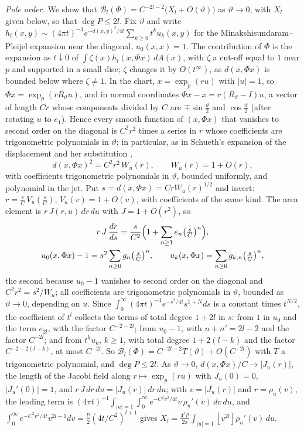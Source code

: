 \documentclass[pdflatex,sn-mathphys-num]{sn-jnl}
\theoremstyle{thmstyleone}%
\theoremstyle{thmstylethree}%
\begin{document}
\emph{Pole order.} We show that $\mathcal B_l(\Phi)=C^{-2l-2}\bigl(X_l+O(\vartheta)\bigr)$ as $\vartheta\to0$, with $X_l$ given below, so that $\deg P\le2l$. Fix $\vartheta$ and write $h_t(x,y)\sim(4\pi t)^{-1}e^{-d(x,y)^2/4t}\sum_{k\ge0}t^ku_k(x,y)$ for the Minakshisundaram--Pleijel expansion near the diagonal, $u_0(x,x)=1$. The contribution of $\Phi$ is the expansion as $t\downarrow0$ of $\int\zeta(x)h_t(x,\Phi x)\,dA(x)$, with $\zeta$ a cut-off equal to $1$ near $p$ and supported in a small disc; $\zeta$ changes it by $O(t^\infty)$, as $d(x,\Phi x)$ is bounded below where $\zeta\ne1$. In the chart, $x=\exp_p(ru)$ with $|u|=1$, so $\Phi x=\exp_p(rR_\vartheta u)$, and in normal coordinates $\Phi x-x=r(R_\vartheta-I)u$, a vector of length $Cr$ whose components divided by $C$ are $\mp\sin\frac\vartheta2$ and $\cos\frac\vartheta2$ (after rotating $u$ to $e_1$). Hence every smooth function of $(x,\Phi x)$ that vanishes to second order on the diagonal is $C^2r^2$ times a series in $r$ whose coefficients are trigonometric polynomials in $\vartheta$; in particular, as in Schueth's expansion of the displacement \cite[Cor.~2.4, Lemma~3.4, (3.2)]{schueth2019} and her substitution \cite[(3.4), (3.5)]{schueth2019},
\[
d(x,\Phi x)^2=C^2r^2\,W_u(r),\qquad W_u(r)=1+O(r),
\]
with coefficients trigonometric polynomials in $\vartheta$, bounded uniformly, and polynomial in the jet. Put $s=d(x,\Phi x)=CrW_u(r)^{1/2}$ and invert: $r=\frac sC\,V_u(\frac sC)$, $V_u(v)=1+O(v)$, with coefficients of the same kind. The area element is $r\,J(r,u)\,dr\,du$ with $J=1+O(r^2)$, so
\begin{gather*}
r\,J\,\frac{dr}{ds}=\frac{s}{C^2}\Bigl(1+\sum_{n\ge1}e_n\bigl(\tfrac sC\bigr)^n\Bigr),\\
u_0(x,\Phi x)-1=s^2\sum_{n\ge0}g_n\bigl(\tfrac sC\bigr)^n,\qquad u_k(x,\Phi x)=\sum_{n\ge0}g_{k,n}\bigl(\tfrac sC\bigr)^n,
\end{gather*}
the second because $u_0-1$ vanishes to second order on the diagonal \cite[(2.3)]{schueth2019} and $C^2r^2=s^2/W_u$; all coefficients are trigonometric polynomials in $\vartheta$, bounded as $\vartheta\to0$, depending on $u$. Since $\int_0^\infty(4\pi t)^{-1}e^{-s^2/4t}s^{1+N}ds$ is a constant times $t^{N/2}$, the coefficient of $t^l$ collects the terms of total degree $1+2l$ in $s$: from $1$ in $u_0$ and the term $e_{2l}$, with the factor $C^{-2-2l}$; from $u_0-1$, with $n+n'=2l-2$ and the factor $C^{-2l}$; and from $t^ku_k$, $k\ge1$, with total degree $1+2(l-k)$ and the factor $C^{-2-2(l-k)}$, at most $C^{-2l}$. So $\mathcal B_l(\Phi)=C^{-2l-2}T(\vartheta)+O(C^{-2l})$ with $T$ a trigonometric polynomial, and $\deg P\le2l$. As $\vartheta\to0$, $d(x,\Phi x)/C\to|J_u(r)|$, the length of the Jacobi field along $r\mapsto\exp_p(ru)$ with $J_u(0)=0$, $|J_u'(0)|=1$, and $r\,J\,dr\,du=|J_u(r)|\,dr\,du$; with $v=|J_u(r)|$ and $r=\rho_u(v)$, the leading term is $(4\pi t)^{-1}\int_{|u|=1}\int_0^\infty e^{-C^2v^2/4t}v\,\rho_u'(v)\,dv\,du$, and $\int_0^\infty e^{-C^2v^2/4t}v^{2l+1}dv=\frac{l!}2(4t/C^2)^{l+1}$ gives $X_l=\frac{4^l\,l!}{2\pi}\int_{|u|=1}[v^{2l}]\rho_u'(v)\,du$.
\end{document}

